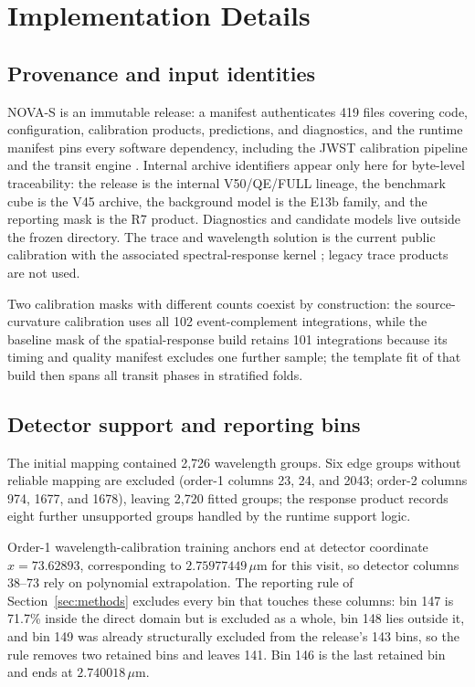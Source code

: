 \section{\nova{} Implementation Details}
\label{app:nova}

\subsection{Provenance and input identities}

NOVA-S is an immutable release: a manifest authenticates 419 files covering
code, configuration, calibration products, predictions, and diagnostics,
and the runtime manifest pins every software dependency, including the
JWST calibration pipeline \citep{JWSTPipeline2025} and the transit engine
\citep{Jaxoplanet2025}. Internal archive identifiers appear only here for
byte-level traceability: the release is the internal V50/QE/FULL lineage,
the benchmark cube is the V45 archive, the background model is the E13b
family, and the reporting mask is the R7 product. Diagnostics and
candidate models live outside the frozen directory. The trace and
wavelength solution is the current public calibration
\citep{BainesEtAl2023Trace,BainesEtAl2023Wavelength} with the associated
spectral-response kernel \citep{DarveauBernierEtAl2022}; legacy trace
products are not used.

Two calibration masks with different counts coexist by construction: the
source-curvature calibration uses all 102 event-complement integrations,
while the baseline mask of the spatial-response build retains 101
integrations because its timing and quality manifest excludes one further
sample; the template fit of that build then spans all transit phases in
stratified folds.

\subsection{Detector support and reporting bins}

The initial mapping contained 2{,}726 wavelength groups. Six edge groups
without reliable mapping are excluded (order-1 columns 23, 24, and 2043;
order-2 columns 974, 1677, and 1678), leaving 2{,}720 fitted groups; the
response product records eight further unsupported groups handled by the
runtime support logic.

Order-1 wavelength-calibration training anchors end at detector coordinate
$x=73.62893$, corresponding to $2.75977449\,\mu\mathrm{m}$ for this visit,
so detector columns 38--73 rely on polynomial extrapolation. The
reporting rule of Section~\ref{sec:methods} excludes every bin that
touches these columns: bin 147 is 71.7\% inside the direct domain but is
excluded as a whole, bin 148 lies outside it, and bin 149 was already
structurally excluded from the release's 143 bins, so the rule removes two
retained bins and leaves 141. Bin 146 is the last retained bin and ends at
$2.740018\,\mu\mathrm{m}$.

